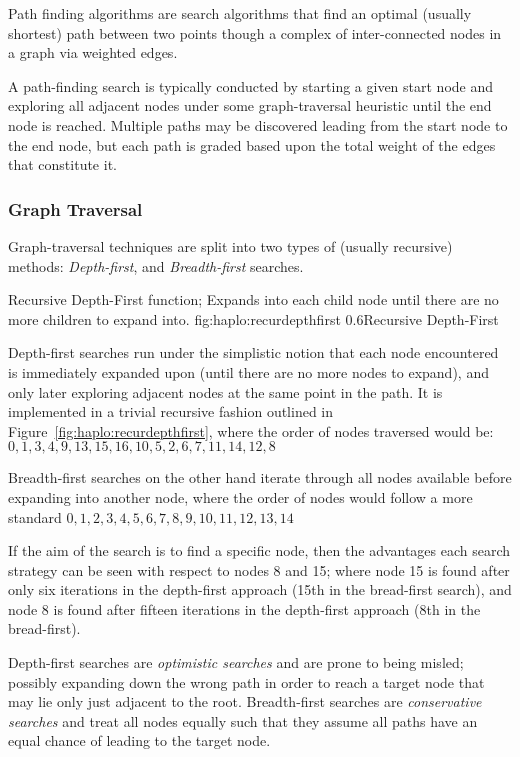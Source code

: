 Path finding algorithms are search algorithms that find an optimal (usually shortest) path between  two points though a complex of inter-connected nodes in a graph via weighted edges. 

A path-finding search is typically conducted by starting a given start node and exploring all adjacent nodes under some graph-traversal heuristic until the end node is reached. Multiple paths may be discovered leading from the start node to the end node, but each path is graded based upon the total weight of the edges that constitute it.

\subsubsection{Graph Traversal}\label{ref:haplo:graphtrav}
Graph-traversal techniques are split into two types of (usually recursive) methods: \textit{Depth-first}, and \textit{Breadth-first} searches.

	{Recursive Depth-First function; Expands into each child node until there are no more children to expand into.}
	{fig:haplo:recurdepthfirst}
	{0.6}{Recursive Depth-First}

Depth-first searches run under the simplistic notion that each node encountered is immediately expanded upon (until there are no more nodes to expand), and only later exploring adjacent nodes at the same point in the path. It is implemented in a trivial recursive fashion outlined in Figure~\ref{fig:haplo:recurdepthfirst}, where the order of nodes traversed would be: ${0,1,3,4,9,13,15,16,10,5,2,6,7,11,14,12,8}$

Breadth-first searches on the other hand iterate through all nodes available before expanding into another node, where the order of nodes would follow a more standard ${0,1,2,3,4,5,6,7,8,9,10,11,12,13,14}$

If the aim of the search is to find a specific node, then the advantages each search strategy can be seen with respect to nodes 8 and 15; where node 15 is found after only six iterations in the depth-first approach (15th in the bread-first search), and node 8 is found after fifteen iterations in the depth-first approach (8th in the bread-first).

Depth-first searches are \textit{optimistic searches} and are prone to being misled; possibly expanding down the wrong path in order to reach a target node that may lie only just adjacent to the root.  Breadth-first searches are \textit{conservative searches} and treat all nodes equally such that they assume all paths have an equal chance of leading to the target node. 

